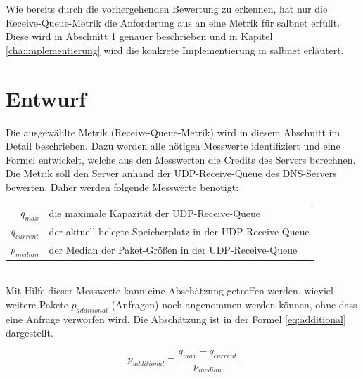 \documentclass[a4paper, 12pt, BCOR10mm, DIV12, toc=bibliography, toc=listof, german]{scrbook}
\begin{document}
		Wie bereits durch die vorhergehenden Bewertung zu erkennen, hat nur die Receive-Queue-Metrik die
		Anforderung aus \cite{scsczile2008} an eine Metrik für salbnet erfüllt. Diese wird in Abschnitt
		\ref{sec:entwurf} genauer beschrieben und in Kapitel \ref{cha:implementierung} wird die
		konkrete Implementierung in salbnet erläutert.


		\section{Entwurf} %
		\label{sec:entwurf}

		Die ausgewählte Metrik (Receive-Queue-Metrik) wird in diesem Abschnitt im Detail beschrieben.
		Dazu werden alle nötigen Messwerte identifiziert und eine Formel entwickelt, welche aus den
		Messwerten die Credits des Servers berechnen. Die Metrik soll den Server anhand der
		UDP-Receive-Queue des DNS-Servers bewerten. Daher werden folgende Messwerte benötigt: $~$\\
		
		\begin{tabular}{rl}
			$q_{max}$		  & die maximale Kapazität der UDP-Receive-Queue\\
			$q_{current}$ &	der aktuell belegte Speicherplatz in der UDP-Receive-Queue\\
			$p_{median}$  &	der Median der Paket-Größen in der UDP-Receive-Queue\\
		\end{tabular}
		
		$~$\\
		Mit Hilfe dieser Messwerte kann eine Abschätzung getroffen werden, wieviel weitere Pakete
		$p_{additional}$ (Anfragen) noch angenommen werden können, ohne dass eine Anfrage verworfen wird.
		Die Abschätzung ist in der Formel \ref{eq:additional} dargestellt. 

		\begin{equation}
			p_{additional} = \frac{q_{max} - q_{current}}{p_{median}}
			\label{eq:additional}
		\end{equation}
\end{document}

